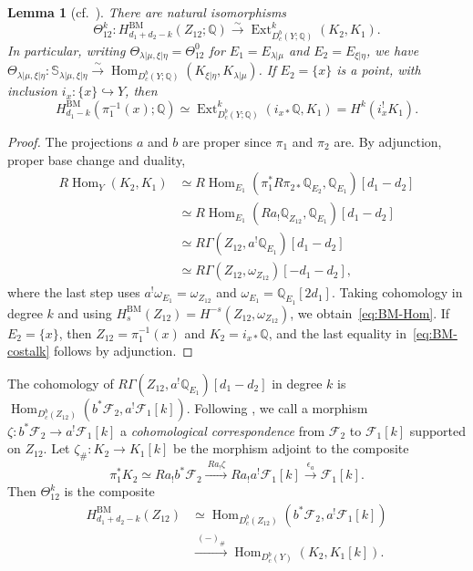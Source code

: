 \documentclass[11pt,a4paper]{amsart}
\newtheorem{lemma}[theorem]{Lemma}
\theoremstyle{definition}
\theoremstyle{remark}
\newcommand{\Q}{\mathbb Q}
\newcommand{\bS}{\mathbb S}
\newcommand{\BM}{\mathrm{BM}}
\newcommand{\Hom}{\operatorname{Hom}}
\newcommand{\Ext}{\operatorname{Ext}}
\newcommand{\lm}{\lambda|\mu}
\newcommand{\xh}{\xi|\eta}
\numberwithin{equation}{section}
\begin{document}
\begin{lemma}[{cf.\ \cite[(3.13)]{DRsurvey}}]\label{lem:BM-Hom}
There are natural isomorphisms
\begin{equation}\label{eq:BM-Hom}
\Theta_{12}^{k}:
H^{\BM}_{d_1+d_2-k}(Z_{12};\Q)
\xrightarrow{\sim}
\Ext^k_{D_c^b(Y;\Q)}(K_2,K_1).
\end{equation}
In particular, writing $\Theta_{\lm,\xh}=\Theta^0_{12}$ for
$E_1=E_{\lm}$ and $E_2=E_{\xh}$, we have
$\Theta_{\lm,\xh}:\bS_{\lm,\xh}\xrightarrow{\sim}
\Hom_{D_c^b(Y;\Q)}(K_{\xh},K_{\lm})$. If $E_2=\{x\}$ is a point, with
inclusion $i_x:\{x\}\hookrightarrow Y$, then
\begin{equation}\label{eq:BM-costalk}
H^{\BM}_{d_1-k}(\pi_1^{-1}(x);\Q)
\simeq\Ext^k_{D_c^b(Y;\Q)}(i_{x*}\Q,K_1)
=H^k(i_x^!K_1).
\end{equation}
\end{lemma}
\begin{proof}
The projections $a$ and $b$ are proper since $\pi_1$ and $\pi_2$ are.
By adjunction, proper base change and duality,
\begin{align*}
R\Hom_Y(K_2,K_1)
&\simeq R\Hom_{E_1}
 (\pi_1^*R\pi_{2*}\Q_{E_2},\Q_{E_1})[d_1-d_2]\\
&\simeq R\Hom_{E_1}(Ra_!\Q_{Z_{12}},\Q_{E_1})[d_1-d_2]\\
&\simeq R\Gamma(Z_{12},a^!\Q_{E_1})[d_1-d_2]\\
&\simeq R\Gamma(Z_{12},\omega_{Z_{12}})[-d_1-d_2],
\end{align*}
where the last step uses $a^!\omega_{E_1}=\omega_{Z_{12}}$ and
$\omega_{E_1}=\Q_{E_1}[2d_1]$. Taking cohomology in degree $k$ and using
$H_s^{\BM}(Z_{12})=H^{-s}(Z_{12},\omega_{Z_{12}})$, we
obtain~\eqref{eq:BM-Hom}. If $E_2=\{x\}$, then $Z_{12}=\pi_1^{-1}(x)$ and
$K_2=i_{x*}\Q$, and the last equality in~\eqref{eq:BM-costalk} follows
by adjunction.
\end{proof}

The cohomology of $R\Gamma(Z_{12},a^!\Q_{E_1})[d_1-d_2]$ in degree $k$
is $\Hom_{D_c^b(Z_{12})}(b^*\mathcal F_2,a^!\mathcal F_1[k])$. Following
\cite[Definition~A.1.1]{Yun}, we call a morphism
$\zeta:b^*\mathcal F_2\to a^!\mathcal F_1[k]$ a \emph{cohomological
correspondence} from $\mathcal F_2$ to $\mathcal F_1[k]$ supported on
$Z_{12}$. Let $\zeta_\#:K_2\to K_1[k]$ be the morphism adjoint to the
composite
\begin{equation}\label{eq:corr-action}
\pi_1^*K_2\simeq Ra_!b^*\mathcal F_2
\xrightarrow{\ Ra_!\zeta\ }Ra_!a^!\mathcal F_1[k]
\xrightarrow{\ \epsilon_a\ }\mathcal F_1[k].
\end{equation}
Then $\Theta^k_{12}$ is the composite
\begin{equation}\label{eq:Corr-Hom}
\begin{aligned}
H^{\BM}_{d_1+d_2-k}(Z_{12})
&\simeq\Hom_{D_c^b(Z_{12})}
       (b^*\mathcal F_2,a^!\mathcal F_1[k])\\
&\xrightarrow{\ (-)_\#\ }\Hom_{D_c^b(Y)}(K_2,K_1[k]).
\end{aligned}
\end{equation}
\end{document}

